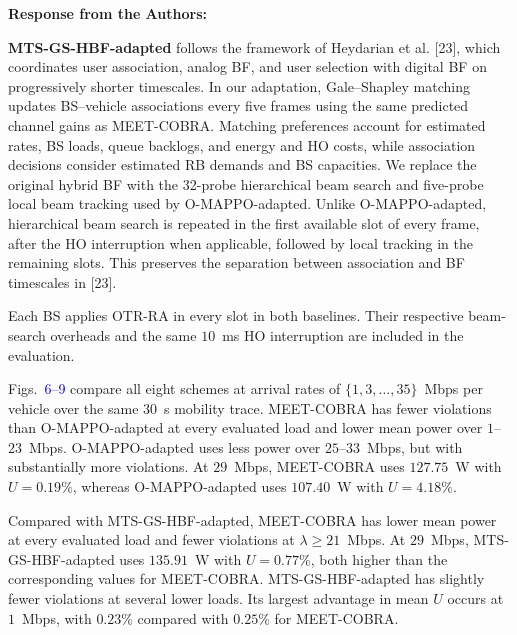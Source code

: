 \documentclass[11pt]{article}
\newenvironment{reviewedit}[1]
{\colorlet{responseblue}{#1}\colorlet{changeblue}{#1}\color{#1}}
{}
\newenvironment{authorresponse}
{\par\Needspace{3\baselineskip}\noindent\textcolor{responseblue}{\textbf{Response from the Authors:}}\par\nobreak\color{responseblue}}
{\par}
\begin{document}
\begin{reviewedit}{blue}
\begin{authorresponse}
\textbf{MTS-GS-HBF-adapted} follows the framework of Heydarian et al. [23],
which coordinates user association, analog BF, and user selection with
digital BF on progressively shorter timescales. In our adaptation,
Gale--Shapley matching updates BS--vehicle associations every five frames
using the same predicted channel gains as MEET-COBRA. Matching preferences
account for estimated rates, BS loads, queue backlogs, and energy and HO costs,
while association decisions consider estimated RB demands and BS capacities.
We replace the original hybrid BF with the 32-probe hierarchical beam search
and five-probe local beam tracking used by O-MAPPO-adapted. Unlike O-MAPPO-adapted, hierarchical
beam search is repeated in the first available slot of every frame, after the HO
interruption when applicable, followed by local tracking in the remaining
slots. This preserves the separation between association and BF timescales
in [23].

Each BS applies OTR-RA in every slot in both baselines. Their respective
beam-search overheads and the same $10$~ms HO interruption are included in
the evaluation.

Figs.~\textcolor{blue}{6--9} compare all eight schemes at arrival rates of
$\{1,3,\ldots,35\}$~Mbps per vehicle over the same $30$~s mobility trace.
MEET-COBRA has fewer violations than O-MAPPO-adapted at every evaluated load
and lower mean power over $1$--$23$~Mbps. O-MAPPO-adapted uses less power
over $25$--$33$~Mbps, but with substantially more violations. At $29$~Mbps,
MEET-COBRA uses $127.75$~W with $U=0.19\%$, whereas O-MAPPO-adapted uses
$107.40$~W with $U=4.18\%$.

Compared with MTS-GS-HBF-adapted, MEET-COBRA has lower mean power at every
evaluated load and fewer violations at $\lambda\geq21$~Mbps. At $29$~Mbps,
MTS-GS-HBF-adapted uses $135.91$~W with $U=0.77\%$, both higher than the
corresponding values for MEET-COBRA. MTS-GS-HBF-adapted has slightly fewer
violations at several lower loads. Its largest advantage in mean $U$ occurs
at $1$~Mbps, with $0.23\%$ compared with $0.25\%$ for MEET-COBRA.


\end{authorresponse}
\end{reviewedit}
\end{document}

